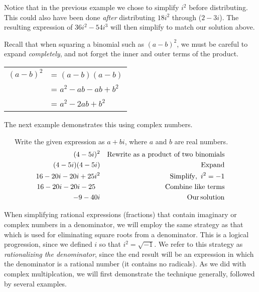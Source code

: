 Notice that in the previous example we chose to simplify $i^2$ before distributing.  This could also have been done \textit{after} distributing $18i^2$ through ($2-3i$).  The resulting expression of $36i^2-54i^3$ will then simplify to match our solution above.\pp
 
\newpage

Recall that when squaring a binomial such as $(a-b)^2$, we must be careful to %
expand \textit{completely}, and not forget the inner and outer terms of the product.
\begin{center}
\begin{tabular}{cl}
$(a-b)^2$ & = $(a-b)(a-b)$\\
&= $a^2-ab-ab+b^2$\\
&= $a^2-2ab+b^2$
\end{tabular}
\end{center}

The next example demonstrates this using complex numbers. 

\begin{example}~~~Write the given expression as $a+bi$, where $a$ and $b$ are real numbers.
  \begin{eqnarray*}
    (4 - 5 i)^2 &  & \text{Rewrite as a product of two binomials}\\
		(4-5i)(4-5i) & & \tmop{Expand}\\
    16-20i-20i+25i^2 &  & \tmop{Simplify,~} i^2=-1\\
    16-20i-20i-25~~ &  & \tmop{Combine~like~terms}\\%
    - 9 - 40 i &  & \tmop{Our} \tmop{solution}
  \end{eqnarray*}
\end{example}

When simplifying rational expressions (fractions) that contain imaginary or complex numbers in a denominator, we will employ the same strategy as that which is used for eliminating square roots from a denominator.  This is a logical progression, since we defined $i$ so that $i^2=\sqrt{-1}$.  We refer to this strategy as \textit{rationalizing the denominator}, since the end result will be an expression in which the denominator is a rational number (it contains no radicals).\pp
As we did with complex multiplcation, we will first demonstrate the technique generally, followed by several examples.


